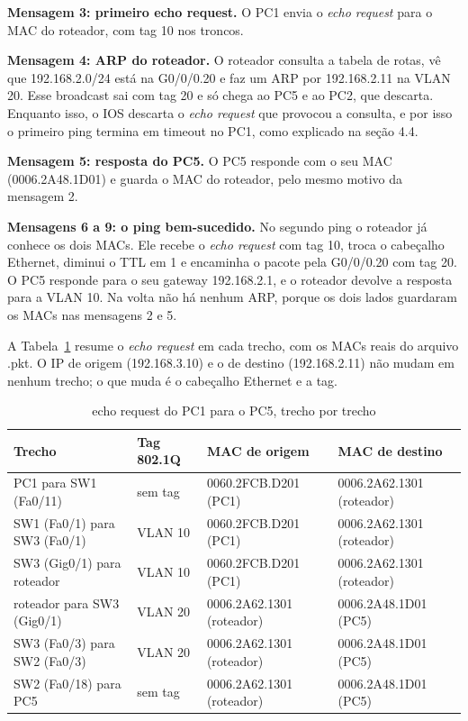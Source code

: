 \textbf{Mensagem 3: primeiro echo request.} O PC1 envia o \emph{echo request} para o MAC do roteador, com tag 10 nos troncos.

\textbf{Mensagem 4: ARP do roteador.} O roteador consulta a tabela de rotas, vê que 192.168.2.0/24 está na G0/0/0.20 e faz um ARP por 192.168.2.11 na VLAN 20. Esse broadcast sai com tag 20 e só chega ao PC5 e ao PC2, que descarta. Enquanto isso, o IOS descarta o \emph{echo request} que provocou a consulta, e por isso o primeiro ping termina em timeout no PC1, como explicado na seção 4.4.

\textbf{Mensagem 5: resposta do PC5.} O PC5 responde com o seu MAC (0006.2A48.1D01) e guarda o MAC do roteador, pelo mesmo motivo da mensagem 2.

\textbf{Mensagens 6 a 9: o ping bem-sucedido.} No segundo ping o roteador já conhece os dois MACs. Ele recebe o \emph{echo request} com tag 10, troca o cabeçalho Ethernet, diminui o TTL em 1 e encaminha o pacote pela G0/0/0.20 com tag 20. O PC5 responde para o seu gateway 192.168.2.1, e o roteador devolve a resposta para a VLAN 10. Na volta não há nenhum ARP, porque os dois lados guardaram os MACs nas mensagens 2 e 5.

A Tabela~\ref{tab:echo} resume o \emph{echo request} em cada trecho, com os MACs reais do arquivo .pkt. O IP de origem (192.168.3.10) e o de destino (192.168.2.11) não mudam em nenhum trecho; o que muda é o cabeçalho Ethernet e a tag.

\begin{table}[H]
\caption{echo request do PC1 para o PC5, trecho por trecho}\label{tab:echo}
\small\renewcommand{\arraystretch}{1.2}
\begin{tabularx}{\textwidth}{@{}>{\raggedright\arraybackslash}Xlll@{}}
\toprule
\textbf{Trecho} & \textbf{Tag 802.1Q} & \textbf{MAC de origem} & \textbf{MAC de destino}\\
\midrule
PC1 para SW1 (Fa0/11) & sem tag & 0060.2FCB.D201 (PC1) & 0006.2A62.1301 (roteador)\\
SW1 (Fa0/1) para SW3 (Fa0/1) & VLAN 10 & 0060.2FCB.D201 (PC1) & 0006.2A62.1301 (roteador)\\
SW3 (Gig0/1) para roteador & VLAN 10 & 0060.2FCB.D201 (PC1) & 0006.2A62.1301 (roteador)\\
roteador para SW3 (Gig0/1) & VLAN 20 & 0006.2A62.1301 (roteador) & 0006.2A48.1D01 (PC5)\\
SW3 (Fa0/3) para SW2 (Fa0/3) & VLAN 20 & 0006.2A62.1301 (roteador) & 0006.2A48.1D01 (PC5)\\
SW2 (Fa0/18) para PC5 & sem tag & 0006.2A62.1301 (roteador) & 0006.2A48.1D01 (PC5)\\
\bottomrule
\end{tabularx}
\fonte
\end{table}

